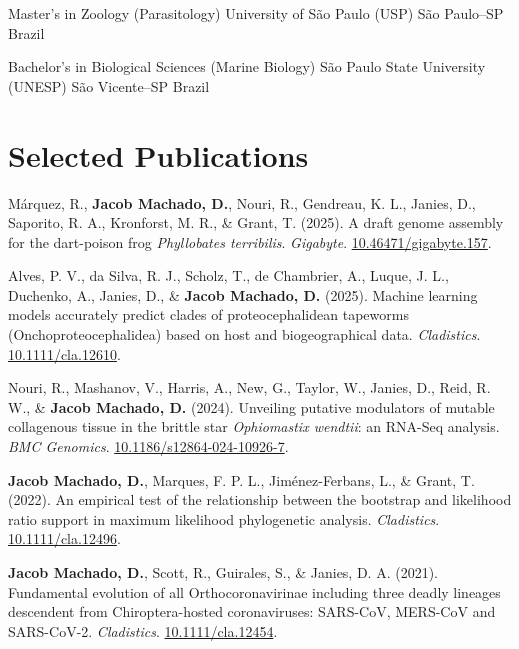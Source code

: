\documentclass[11pt, letterpaper, sans]{moderncv}
\begin{document}
    {Master's in Zoology (Parasitology)}
    {University of São Paulo (USP)}
    {São Paulo--SP}
    {Brazil}
    {}

    {Bachelor's in Biological Sciences (Marine Biology)}
    {São Paulo State University (UNESP)}
    {São Vicente--SP}
    {Brazil}
    {}


\section{Selected Publications}

    \begin{hangparas}{.2in}{1}
    
    Márquez, R., \textbf{Jacob Machado, D.}, Nouri, R., Gendreau, K. L., Janies, D., Saporito, R. A., Kronforst, M. R., \& Grant, T. (2025). A draft genome assembly for the dart-poison frog \textit{Phyllobates terribilis}. \textit{Gigabyte}. \href{https://doi.org/10.46471/gigabyte.157}{10.46471/gigabyte.157}.
    
    Alves, P. V., da Silva, R. J., Scholz, T., de Chambrier, A., Luque, J. L., Duchenko, A., Janies, D., \& \textbf{Jacob Machado, D.} (2025). Machine learning models accurately predict clades of proteocephalidean tapeworms (Onchoproteocephalidea) based on host and biogeographical data. \textit{Cladistics}. \href{https://doi.org/10.1111/cla.12610}{10.1111/cla.12610}.
    
    Nouri, R., Mashanov, V., Harris, A., New, G., Taylor, W., Janies, D., Reid, R. W., \& \textbf{Jacob Machado, D.} (2024). Unveiling putative modulators of mutable collagenous tissue in the brittle star \textit{Ophiomastix wendtii}: an RNA-Seq analysis. \textit{BMC Genomics}. \href{https://doi.org/10.1186/s12864-024-10926-7}{10.1186/s12864-024-10926-7}.
    
    \textbf{Jacob Machado, D.}, Marques, F. P. L., Jiménez-Ferbans, L., \& Grant, T. (2022). An empirical test of the relationship between the bootstrap and likelihood ratio support in maximum likelihood phylogenetic analysis. \textit{Cladistics}. \href{https://doi.org/10.1111/cla.12496}{10.1111/cla.12496}.
    
    \textbf{Jacob Machado, D.}, Scott, R., Guirales, S., \& Janies, D. A. (2021). Fundamental evolution of all Orthocoronavirinae including three deadly lineages descendent from Chiroptera-hosted coronaviruses: SARS-CoV, MERS-CoV and SARS-CoV-2. \textit{Cladistics}. \href{https://doi.org/10.1111/cla.12454}{10.1111/cla.12454}.
    

\end{hangparas}
\end{document}
